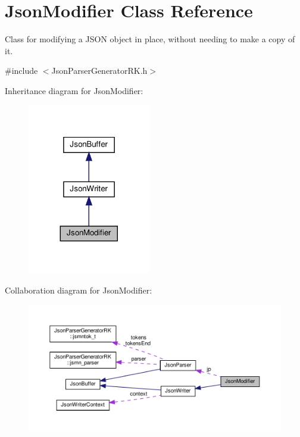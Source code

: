 \hypertarget{class_json_modifier}{}\section{Json\+Modifier Class Reference}
\label{class_json_modifier}


Class for modifying a J\+S\+ON object in place, without needing to make a copy of it.  




{\ttfamily \#include $<$Json\+Parser\+Generator\+R\+K.\+h$>$}



Inheritance diagram for Json\+Modifier\+:
\nopagebreak
\begin{figure}[H]
\begin{center}
\leavevmode
\includegraphics[width=152pt]{class_json_modifier__inherit__graph}
\end{center}
\end{figure}


Collaboration diagram for Json\+Modifier\+:
\nopagebreak
\begin{figure}[H]
\begin{center}
\leavevmode
\includegraphics[width=350pt]{class_json_modifier__coll__graph}
\end{center}
\end{figure}
